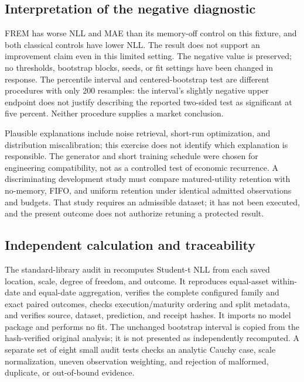 \documentclass[11pt,a4paper]{article}
\begin{document}


\subsection{Interpretation of the negative diagnostic}
FREM has worse NLL and MAE than its memory-off control on this fixture, and both classical controls have lower NLL. The result does not support an improvement claim even in this limited setting. The negative value is preserved; no thresholds, bootstrap blocks, seeds, or fit settings have been changed in response. The percentile interval and centered-bootstrap test are different procedures with only 200 resamples: the interval's slightly negative upper endpoint does not justify describing the reported two-sided test as significant at five percent. Neither procedure supplies a market conclusion.

Plausible explanations include noise retrieval, short-run optimization, and distribution miscalibration; this exercise does not identify which explanation is responsible. The generator and short training schedule were chosen for engineering compatibility, not as a controlled test of economic recurrence. A discriminating development study must compare matured-utility retention with no-memory, FIFO, and uniform retention under identical admitted observations and budgets. That study requires an admissible dataset; it has not been executed, and the present outcome does not authorize retuning a protected result.

\subsection{Independent calculation and traceability}
The standard-library audit in  recomputes Student-t NLL from each saved location, scale, degree of freedom, and outcome. It reproduces equal-asset within-date and equal-date aggregation, verifies the complete configured family and exact paired outcomes, checks execution/maturity ordering and split metadata, and verifies source, dataset, prediction, and receipt hashes. It imports no model package and performs no fit. The unchanged bootstrap interval is copied from the hash-verified original analysis; it is not presented as independently recomputed. A separate set of eight small audit tests checks an analytic Cauchy case, scale normalization, uneven observation weighting, and rejection of malformed, duplicate, or out-of-bound evidence.
\end{document}
